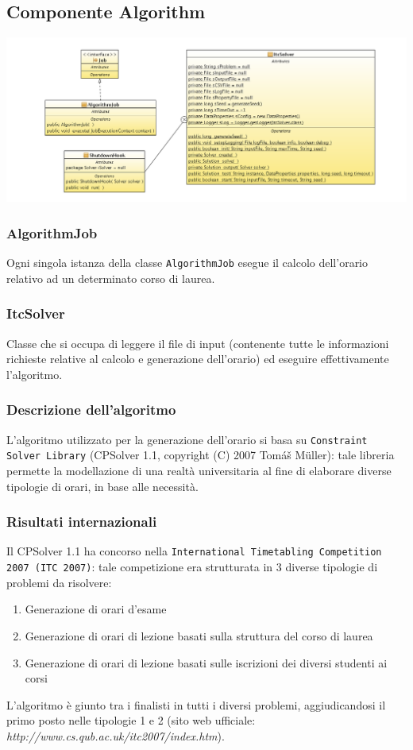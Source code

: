 \documentclass[11pt,a4paper]{article}
\begin{document}
\subsection{Componente Algorithm}
\includegraphics[scale=0.34]{images/MMalg_diagram_class.png}
\subsubsection{AlgorithmJob}
Ogni singola istanza della classe \verb|AlgorithmJob| esegue il calcolo dell'orario relativo ad un determinato corso di laurea.
\subsubsection{ItcSolver}
Classe che si occupa di leggere il file di input (contenente tutte le informazioni richieste relative al calcolo e generazione dell'orario) ed eseguire effettivamente l'algoritmo.
\subsubsection{Descrizione dell'algoritmo}
L'algoritmo utilizzato per la generazione dell'orario si basa su \verb|Constraint Solver Library| (CPSolver 1.1,  copyright (C) 2007 Tomáš Müller): tale libreria permette la modellazione di una realtà universitaria al fine di elaborare diverse tipologie di orari, in base alle necessità.
\subsubsection*{Risultati internazionali}
Il CPSolver 1.1 ha concorso nella \verb|International Timetabling Competition 2007 (ITC 2007)|: tale competizione era strutturata in 3 diverse tipologie di problemi da risolvere:
\begin{enumerate}
 \item Generazione di orari d'esame
 \item Generazione di orari di lezione basati sulla struttura del corso di laurea
 \item Generazione di orari di lezione basati sulle iscrizioni dei diversi studenti ai corsi
\end{enumerate}
L'algoritmo è giunto tra i finalisti in tutti i diversi problemi, aggiudicandosi il primo posto nelle tipologie 1 e 2 (sito web ufficiale: \textit{http://www.cs.qub.ac.uk/itc2007/index.htm}).
\end{document}
